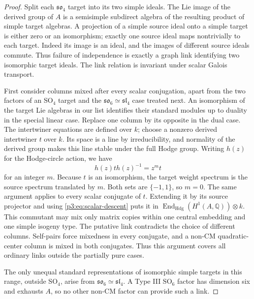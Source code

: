 \documentclass[11pt]{article}
\newcommand{\Q}{\mathbb Q}
\numberwithin{equation}{section}
\begin{document}
\begin{proof}
Split each \(\mathfrak{so}_4\) target into its two simple ideals.
The Lie image of the derived group of \(A\) is a semisimple
subdirect algebra of the resulting product of simple target
algebras.  A projection of a simple source ideal onto a simple
target is either zero or an isomorphism; exactly one source ideal
maps nontrivially to each target.  Indeed its image is an ideal,
and the images of different source ideals commute.  Thus failure
of independence is exactly a graph link identifying two
isomorphic target ideals.  The link relation is invariant under
scalar Galois transport.

First consider columns mixed after every scalar conjugation,
apart from the two factors of an \(\mathrm{SO}_4\) target and
the \(\mathfrak{so}_6\simeq\mathfrak{sl}_4\) case treated next.  An
isomorphism of the target Lie algebras in our list identifies
their standard modules up to duality in the special linear case.
Replace one column by its opposite in the dual case.  The intertwiner
equations are defined over \(k\); choose a nonzero derived
intertwiner \(t\) over \(k\).  Its space is a line by
irreducibility, and normality of the derived group makes this line
stable under the full Hodge group.  Writing \(h(z)\) for the
Hodge-circle action, we have
\[
 h(z)t h(z)^{-1}=z^m t
\]
for an integer \(m\).  Because \(t\) is an isomorphism, the
target weight spectrum is the source spectrum translated by \(m\).
Both sets are \(\{-1,1\}\), so \(m=0\).  The same argument applies
to every scalar conjugate of \(t\).  Extending it by its source
projector and using \eqref{p3:eq:scalar-descent} puts it in
\(\operatorname{End}_{\mathrm{Hdg}}(H^1(A,\Q))\otimes k\).
This commutant may mix only matrix copies within one central
embedding and one simple isogeny type.  The putative link
contradicts the choice of different columns.
Self-pairs force mixedness in every conjugate, and a non-CM
quadratic-center column is mixed in both conjugates.  Thus this
argument covers all ordinary links outside the partially pure cases.

The only unequal standard representations of isomorphic simple
targets in this range, outside \(\mathrm{SO}_4\), arise from
\(\mathfrak{so}_6\simeq\mathfrak{sl}_4\).  A Type III
\(\mathrm{SO}_6\) factor has dimension six and exhausts \(A\),
so no other non-CM factor can provide such a link.


\end{proof}
\end{document}
